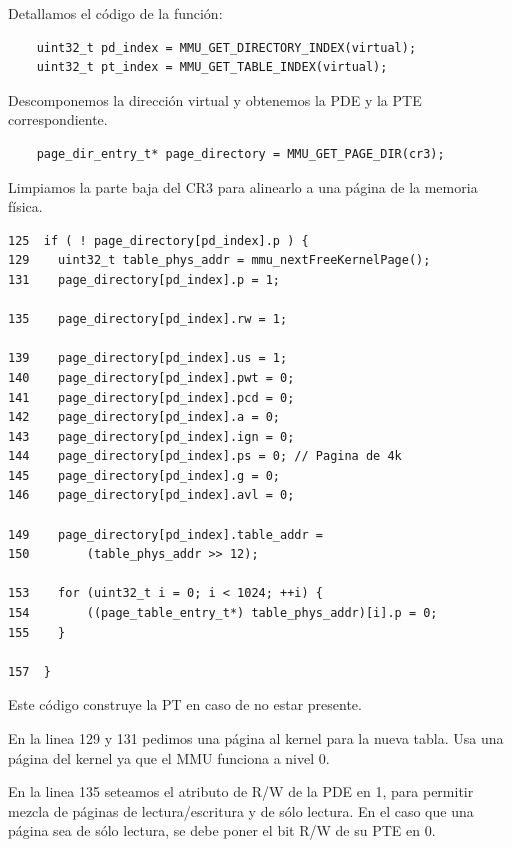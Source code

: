 \documentclass[a4paper]{article}
\newenvironment{codesnippet}{%
	\begin{Sbox}\begin{minipage}{\textwidth}\sffamily\small}%
	{\end{minipage}\end{Sbox}%
		\begin{center}%
		\vspace{-0.4cm}\colorbox{litegrey}{\TheSbox}\end{center}\vspace{0.3cm}}
\begin{document}
Detallamos el código de la función:

\begin{codesnippet}
  \begin{verbatim}
    uint32_t pd_index = MMU_GET_DIRECTORY_INDEX(virtual);
    uint32_t pt_index = MMU_GET_TABLE_INDEX(virtual);
  \end{verbatim}
\end{codesnippet}
Descomponemos la dirección virtual y obtenemos la PDE y la PTE   correspondiente.

\begin{codesnippet}
  \begin{verbatim}
    page_dir_entry_t* page_directory = MMU_GET_PAGE_DIR(cr3);
  \end{verbatim}
\end{codesnippet}

Limpiamos la parte baja del CR3 para alinearlo a una página de la memoria física.

\begin{codesnippet}
\begin{verbatim}
125  if ( ! page_directory[pd_index].p ) {
129    uint32_t table_phys_addr = mmu_nextFreeKernelPage();
131    page_directory[pd_index].p = 1;

135    page_directory[pd_index].rw = 1;
        
139    page_directory[pd_index].us = 1;
140    page_directory[pd_index].pwt = 0;
141    page_directory[pd_index].pcd = 0;
142    page_directory[pd_index].a = 0;
143    page_directory[pd_index].ign = 0;
144    page_directory[pd_index].ps = 0; // Pagina de 4k
145    page_directory[pd_index].g = 0;
146    page_directory[pd_index].avl = 0;

149    page_directory[pd_index].table_addr =
150        (table_phys_addr >> 12);

153    for (uint32_t i = 0; i < 1024; ++i) {
154        ((page_table_entry_t*) table_phys_addr)[i].p = 0;
155    }

157  }
  \end{verbatim}
\end{codesnippet}

Este código construye la PT en caso de no estar presente.

En la linea 129 y 131 pedimos una página al kernel para la nueva tabla. Usa una página del kernel ya que el MMU funciona
a nivel 0.

En la linea 135 seteamos el atributo de R/W de la PDE en 1, para permitir mezcla de páginas de lectura/escritura y de
sólo lectura. En el caso que una página sea de sólo lectura, se debe poner el bit R/W de su PTE en 0.
\end{document}
